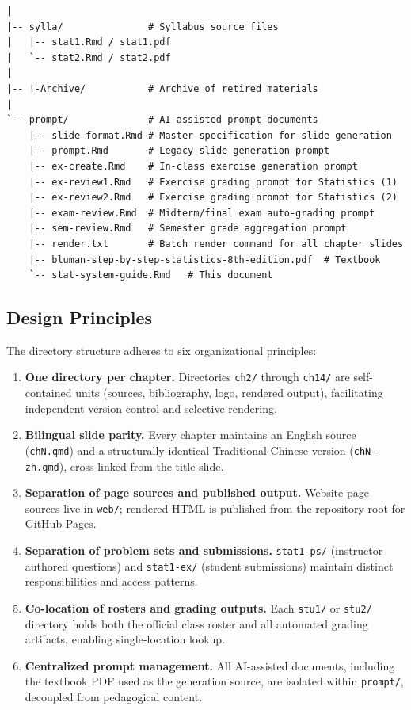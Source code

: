 \documentclass[
]{article}
\providecommand{\tightlist}{%
  \setlength{\itemsep}{0pt}\setlength{\parskip}{0pt}}
\begin{document}
\begin{verbatim}
|
|-- sylla/               # Syllabus source files
|   |-- stat1.Rmd / stat1.pdf
|   `-- stat2.Rmd / stat2.pdf
|
|-- !-Archive/           # Archive of retired materials
|
`-- prompt/              # AI-assisted prompt documents
    |-- slide-format.Rmd # Master specification for slide generation
    |-- prompt.Rmd       # Legacy slide generation prompt
    |-- ex-create.Rmd    # In-class exercise generation prompt
    |-- ex-review1.Rmd   # Exercise grading prompt for Statistics (1)
    |-- ex-review2.Rmd   # Exercise grading prompt for Statistics (2)
    |-- exam-review.Rmd  # Midterm/final exam auto-grading prompt
    |-- sem-review.Rmd   # Semester grade aggregation prompt
    |-- render.txt       # Batch render command for all chapter slides
    |-- bluman-step-by-step-statistics-8th-edition.pdf  # Textbook
    `-- stat-system-guide.Rmd   # This document
\end{verbatim}

\subsection{Design Principles}\label{design-principles}

The directory structure adheres to six organizational principles:

\begin{enumerate}
\def\labelenumi{\arabic{enumi}.}
\tightlist
\item
  \textbf{One directory per chapter.} Directories \texttt{ch2/} through
  \texttt{ch14/} are self-contained units (sources, bibliography, logo,
  rendered output), facilitating independent version control and
  selective rendering.
\item
  \textbf{Bilingual slide parity.} Every chapter maintains an English
  source (\texttt{chN.qmd}) and a structurally identical
  Traditional-Chinese version (\texttt{chN-zh.qmd}), cross-linked from
  the title slide.
\item
  \textbf{Separation of page sources and published output.} Website page
  sources live in \texttt{web/}; rendered HTML is published from the
  repository root for GitHub Pages.
\item
  \textbf{Separation of problem sets and submissions.}
  \texttt{stat1-ps/} (instructor-authored questions) and
  \texttt{stat1-ex/} (student submissions) maintain distinct
  responsibilities and access patterns.
\item
  \textbf{Co-location of rosters and grading outputs.} Each
  \texttt{stu1/} or \texttt{stu2/} directory holds both the official
  class roster and all automated grading artifacts, enabling
  single-location lookup.
\item
  \textbf{Centralized prompt management.} All AI-assisted documents,
  including the textbook PDF used as the generation source, are isolated
  within \texttt{prompt/}, decoupled from pedagogical content.
\end{enumerate}
\end{document}

